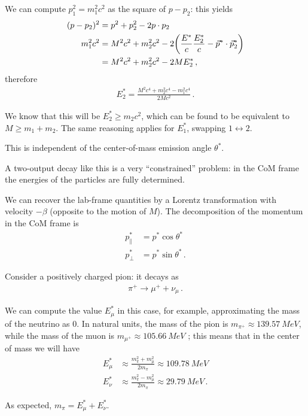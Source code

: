 \documentclass[main.tex]{subfiles}
\begin{document}
We can compute \(p_1^2 = m_1^2 c^2\) as the square of \(p - p_2 \): this yields 
%
\begin{subequations}
\begin{align}
(p - p_2)^2 &= p^2 + p_2^2 - 2 p \cdot p_2   \\
m_1^2 c^2 &= M^2 c^2 +  m_2^2 c^2 - 2 \qty( \frac{E^{*}}{c} \frac{E^{*}_2}{c} - \vec{p}^{*} \cdot \vec{p}^{*}_{2})  \\
&= M^2c^2 + m_2^2c^2 - 2 M E^{*}_{2}
\,,
\end{align}
\end{subequations}
%
therefore 
%
\begin{align}
E^{*}_2 = \frac{M^2 c^4 + m_2^2 c^4 - m_1^2 c^4}{2Mc^2}
\,.
\end{align}

We know that this will be \(E^{*}_{2} \geq m_2c^2\), which can be found to be equivalent to \(M \geq m_1 + m_2 \). 
The same reasoning applies for \(E^{*}_{1}\), swapping \(1 \leftrightarrow 2\). 

This is independent of the center-of-mass emission angle \(\theta^{*}\). 

A two-output decay like this is a very ``constrained'' problem: in the CoM frame the energies of the particles are fully determined.

We can recover the lab-frame quantities by a Lorentz transformation with velocity \(-\beta \) (opposite to the motion of \(M\)). 
The decomposition of the momentum in the CoM frame is 
%
\begin{subequations}
\begin{align}
p^{*}_{\parallel} &= p^{*} \cos \theta^{*} \\
p^{*}_{\perp} &= p^{*} \sin \theta^{*}
\,.
\end{align}
\end{subequations}

Consider a positively charged pion: it decays as 
%
\begin{align}
\pi^{+} \to \mu^{+} + \nu_{\mu}
\,.
\end{align}

We can compute the value \(E^{*}_{\mu }\) in this case, for example, approximating the mass of the neutrino as 0. 
In natural units, the mass of the pion is \(m_{\pi^{+}} \approx \SI{139.57}{MeV}\), while the mass of the muon is \(m_{\mu^{+}} \approx \SI{105.66}{MeV}\) \cite{groupReviewParticlePhysics2020}; this means that in the center of mass we will have 
%
\begin{subequations}
\begin{align}
E_{\mu }^{*} &\approx \frac{m_\pi^2 + m_\mu^2}{2 m_\pi } \approx \SI{109.78}{MeV}  \\
E_\nu^{*} &\approx \frac{m_\pi^2 - m_\mu^2}{2 m_\pi} \approx \SI{29.79}{MeV}
\,.
\end{align}
\end{subequations}

As expected, \(m_\pi = E_\mu^{*} +E_\nu^{*} \). 
\end{document}
